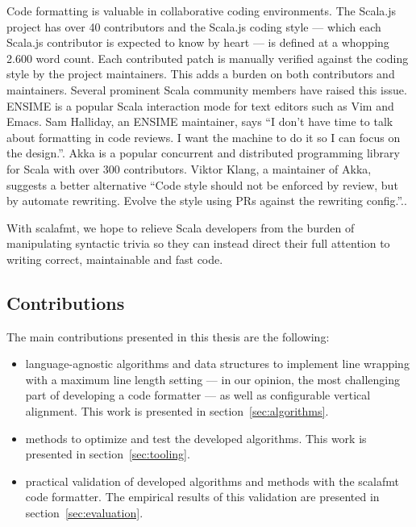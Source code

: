 Code formatting is valuable in collaborative coding environments.
The Scala.js project\autocite{_scala.js_????} has over 40 contributors and the Scala.js coding style\autocite{doeraene_scala.js_2015} --- which each Scala.js contributor is expected to know by heart --- is defined at a whopping 2.600 word count.
Each contributed patch is manually verified against the coding style by the project maintainers.
This adds a burden on both contributors and maintainers.
Several prominent Scala community members have raised this issue.
ENSIME\autocite{_ensime_????} is a popular Scala interaction mode for text editors such as Vim and Emacs.
Sam Halliday, an ENSIME maintainer, says ``I don't have time to talk about formatting in code reviews. I want the machine to do it so I can focus on the design.''\autocite{halliday_i_2016-1}.
Akka\autocite{_akka_????} is a popular concurrent and distributed programming library for Scala with over 300 contributors.
Viktor Klang, a maintainer of Akka, suggests a better alternative ``Code style should not be enforced by review, but by automate rewriting. Evolve the style using PRs against the rewriting config.''.\autocite{klang_code_2016}.

With scalafmt, we hope to relieve Scala developers from the burden of manipulating syntactic trivia so they can instead direct their full attention to writing correct, maintainable and fast code.

\subsection{Contributions}
The main contributions presented in this thesis are the following:
\begin{itemize}
  \item language-agnostic algorithms and data structures to implement line
    wrapping with a maximum line length setting --- in our opinion, the most
    challenging part of developing a code formatter --- as well as configurable
    vertical alignment.
    This work is presented in section~\ref{sec:algorithms}.
  \item methods to optimize and test the developed algorithms.
    This work is presented in section~\ref{sec:tooling}.
  \item practical validation of developed algorithms and methods with the scalafmt code formatter.
    The empirical results of this validation are presented in section~\ref{sec:evaluation}.
\end{itemize}
